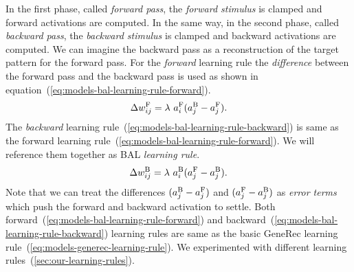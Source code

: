 In the first phase, called \emph{forward pass}, the \emph{forward stimulus} is clamped and forward activations are computed. In the same way, in the second phase, called \emph{backward pass}, the \emph{backward stimulus} is clamped and backward activations are computed. We can imagine the backward pass as a reconstruction of the target pattern for the forward pass. For the \emph{forward} learning rule the \emph{difference} between the forward pass and the backward pass is used as shown in equation~(\ref{eq:models-bal-learning-rule-forward}). 
\begin{equation}
  \label{eq:models-bal-learning-rule-forward}
  \Delta w_{ij}^{\rm F} = \lambda \ a_i^{\rm F}(a_j^{\rm B} - a_j^{\rm F}).
\end{equation}
The \emph{backward} learning rule~(\ref{eq:models-bal-learning-rule-backward}) is same as the forward learning rule~(\ref{eq:models-bal-learning-rule-forward}). We will reference them together as BAL \emph{learning rule}. 
\begin{equation}
  \label{eq:models-bal-learning-rule-backward}
  \Delta w_{ij}^{\rm B} = \lambda \ a_i^{\rm B}(a_j^{\rm F} - a_j^{\rm B}). 
\end{equation}
Note that we can treat the differences $(a_j^{\rm B} - a_j^{\rm F})$ and $(a_j^{\rm F} - a_j^{\rm B})$ as \emph{error terms} which push the forward and backward activation to settle. Both forward~(\ref{eq:models-bal-learning-rule-forward}) and backward~(\ref{eq:models-bal-learning-rule-backward}) learning rules are same as the basic GeneRec learning rule~(\ref{eq:models-generec-learning-rule}). We experimented with different learning rules~(\ref{sec:our-learning-rules}). 

 


